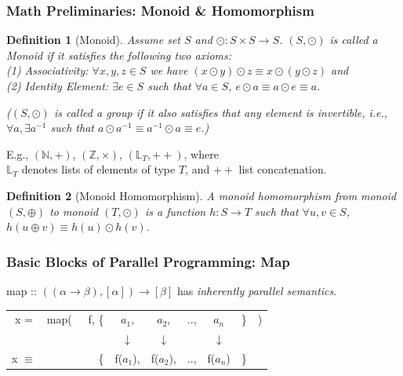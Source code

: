 \documentclass{beamer}
\renewcommand{\emph}[1]{\textcolor{structure}{#1}}
\newcommand{\emp}[1]{\textcolor{DikuRed}{ #1}}
\newtheorem{mydef}{Definition}
\begin{document}
\begin{frame}[fragile,t]
\frametitle{Math Preliminaries: Monoid \& Homomorphism}

\begin{mydef}[Monoid]\label{MonoidDef}\vspace{-1ex}
Assume set $S$ and $\odot : S \times S \rightarrow S$.
\emp{$(S, \odot)$ is called a Monoid} if it satisfies the following two axioms:\\
\emp{(1) Associativity:} $\forall x,y,z\in S$ we have 
    $(x \odot y) \odot z \equiv x \odot (y \odot z)$ and\\
\emp{(2) Identity Element:} $\exists e \in S$ such that $\forall a \in S$, %
    $e \odot a \equiv a \odot e \equiv a$.\\\medskip

($(S,\odot)$ is called a group if it also satisfies that any element is 
    invertible, i.e., 
    $\forall a, \exists a^{-1}$ such that 
    $a\odot a^{-1}\equiv a^{-1}\odot a\equiv e$.)
\end{mydef}

E.g., $(\mathbb{N},+)$, $(\mathbb{Z},\times)$, $(\mathbb{L}_T,++)$, where\\
        $\mathbb{L}_T$ denotes lists of elements of type $T$,
        and $++$ list concatenation. 

\pause

\begin{mydef}[Monoid Homomorphism]\label{HomDef}\vspace{-1ex}
\emp{A monoid homomorphism} from monoid $(S,\oplus)$ to monoid $(T,\odot)$
is a function $h : S \rightarrow T$ such that $\forall u, v\in S$,
\emp{$h(u\oplus v) \equiv h(u)\odot h(v)$}.
\end{mydef}


\end{frame}


\begin{frame}[fragile,t]
   \frametitle{Basic Blocks of Parallel Programming: Map}

\bigskip

\emp{map} :: $((\alpha \rightarrow \beta), [\alpha]) \rightarrow [\beta] $ has \emph{\em inherently parallel semantics}.


\bigskip

\begin{tabular}{crcccccl}
x = & \emp{map}(~~~f, \{& $a_1$, & $a_2$, & .., & $a_n$ & \} & )\\
    &      & $\downarrow$ & $\downarrow$ &  & $\downarrow$ & &\\
x $\equiv$ &  \{  & \emph{f($a_1$)}, & \emph{f($a_2$)}, & .., & \emph{f($a_n$)} & \} &
\end{tabular}

\end{frame}
\end{document}
